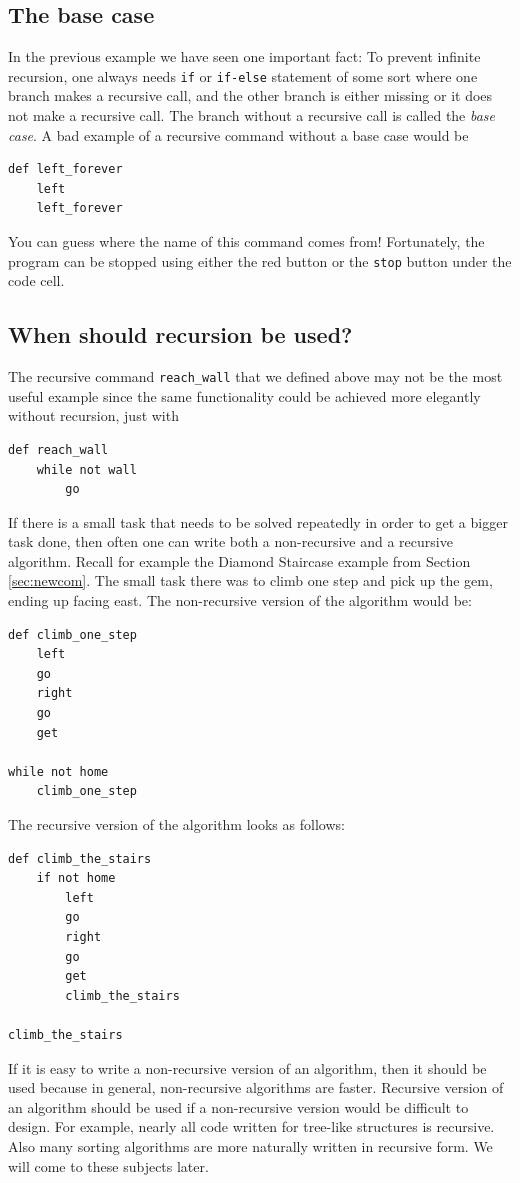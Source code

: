 \subsection{The base case}

In the previous example we have seen one important fact: To prevent infinite recursion, one always needs {\tt if} or {\tt if-else} 
statement of some sort where one branch makes a recursive call, and the other branch is either 
missing or it does not make a recursive call. The branch without a recursive 
call is called the {\em base case}. A bad example of a recursive command without a base case would be 

\begin{verbatim}
def left_forever
    left
    left_forever
\end{verbatim}
\noindent
You can guess where the name of this command comes from! Fortunately, the program can be stopped using 
either the red button or the {\tt stop} button under the code cell.

\subsection{When should recursion be used?}

The recursive command {\tt reach\_wall} that we defined above may not be the most useful example 
since the same functionality could be achieved more elegantly without recursion, just with

\begin{verbatim}
def reach_wall
    while not wall
        go
\end{verbatim}
If there is a small task that needs to be solved repeatedly in order to get a bigger task done,
then often one can write both a non-recursive and a recursive algorithm. Recall for example the Diamond
Staircase example from Section \ref{sec:newcom}. The small task there was to climb one step and pick 
up the gem, ending up facing east. The non-recursive version of the algorithm would be:

\begin{verbatim}
def climb_one_step
    left
    go
    right
    go
    get

while not home
    climb_one_step
\end{verbatim}
The recursive version of the algorithm looks as follows:

\begin{verbatim}
def climb_the_stairs
    if not home
        left
        go
        right
        go
        get
        climb_the_stairs

climb_the_stairs
\end{verbatim}
If it is easy to write a non-recursive version of an algorithm, then it should be used
because in general, non-recursive algorithms are faster. 
Recursive version of an algorithm should be used if a non-recursive version would 
be difficult to design. For example, nearly all code written for tree-like structures 
is recursive. Also many sorting algorithms are more naturally written in recursive form.
We will come to these subjects later.


